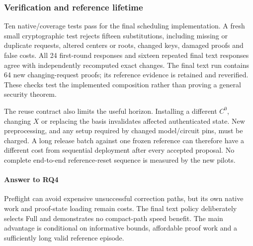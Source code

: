 \subsubsection{Verification and reference lifetime}
Ten native/coverage tests pass for the final scheduling implementation.
A fresh small cryptographic test rejects fifteen substitutions, including
missing or duplicate requests, altered centers or roots, changed keys,
damaged proofs and false costs. All 24 first-round responses and sixteen
repeated final text responses agree with independently recomputed exact
changes. The final text run contains 64 new changing-request proofs; its
reference evidence is retained and reverified. These checks test the
implemented composition rather than proving a general security theorem.

The reuse contract also limits the useful horizon. Installing a different
$C^0$, changing $X$ or replacing the basis invalidates affected authenticated
state. New preprocessing, and any setup required by changed model/circuit
pins, must be charged. A long release batch against one frozen reference
can therefore have a different cost from sequential deployment after every
accepted proposal. No complete end-to-end reference-reset sequence is
measured by the new pilots.

\paragraph{Answer to RQ4}
Preflight can avoid expensive unsuccessful correction paths, but its own
native work and proof-state loading remain costs. The final text policy
deliberately selects Full and demonstrates no compact-path speed benefit.
The main advantage is conditional on informative bounds, affordable proof
work and a sufficiently long valid reference episode.



